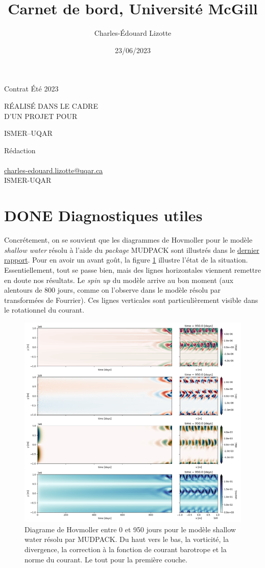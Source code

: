 \documentclass[10pt]{article}
\author{Charles-Édouard Lizotte}
\date{23/06/2023}
\title{Carnet de bord, Université McGill}
\makeatletter
\numberwithin{equation}{section}
\newcommand{\mytitlepage}{
\begin{titlepage}
\begin{center}
{\Large Contrat Été 2023 \par}
\vspace{2cm}
{\Large \MakeUppercase{\thetitle} \par}
\vspace{2cm}
RÉALISÉ DANS LE CADRE\\ D'UN PROJET POUR \par
\vspace{2cm}
{\Large ISMER--UQAR \par}
\vspace{2cm}
{\thedate}
\end{center}
\vfill
Rédaction \\
{\theauthor}\\
\url{charles-edouard.lizotte@uqar.ca}\\
ISMER-UQAR
\end{titlepage}
}
\makeatother
\begin{document}
\mytitlepage
\tableofcontents\newpage



\section{{\bfseries\sffamily DONE} Diagnostiques utiles}
\label{sec:org990e36a}

Concrétement, on se souvient que les diagrammes de Hovmoller pour le modèle \emph{shallow water} résolu à l'aide du \emph{package} MUDPACK sont illustrés dans le \href{rapport-2023-06-16.org}{dernier rapport}.
Pour en avoir un avant goût, la figure \ref{fig:org1555106} illustre l'état de la situation.
Essentiellement, tout se passe bien, mais des lignes horizontales viennent remettre en doute nos résultats.
Le \emph{spin up} du modèle arrive au bon moment (aux alentours de 800 jours, comme on l'observe dans le modèle résolu par transformées de Fourrier).
Ces lignes verticales sont particulièrement visible dans le rotationnel du courant. 

\begin{figure}[htbp]
\centering
\includegraphics[width=.9\linewidth]{figures/tests/2023-06-21_hovmoller1_t=950days.png}
\caption{\label{fig:org1555106}Diagrame de Hovmoller entre 0 et 950 jours pour le modèle shallow water résolu par MUDPACK. Du haut vers le bas, la vorticité, la divergence, la correction à la fonction de courant barotrope et la norme du courant. Le tout pour la première couche.}
\end{figure}
\end{document}

